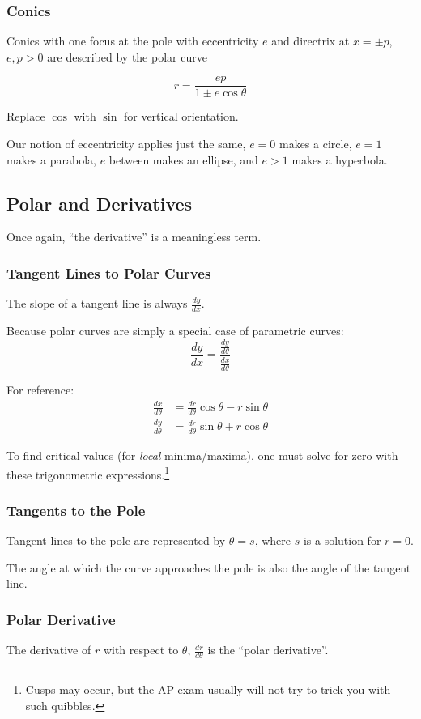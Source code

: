 \documentclass{article}
\begin{document}
\subsubsection{Conics}
Conics with one focus at the pole with eccentricity $e$ and directrix at $x = \pm p$, $e,p > 0$ are described by the polar curve

$$r = \frac{ep}{1\pm e\cos{\theta}}$$

Replace $\cos$ with $\sin$ for vertical orientation.

Our notion of eccentricity applies just the same, $e=0$ makes a circle, $e=1$ makes a parabola, $e$ between makes an ellipse, and $e > 1$ makes a hyperbola.
\subsection{Polar and Derivatives}
Once again, ``the derivative'' is a meaningless term.

\subsubsection{Tangent Lines to Polar Curves} \label{polar-derivatives}
The slope of a tangent line is always $\frac{dy}{dx}$.

Because polar curves are simply a special case of parametric curves:
$$\frac{dy}{dx} = \frac{\frac{dy}{d\theta}}{\frac{dx}{d\theta}}$$

For reference:
\begin{align*}
    \frac{dx}{d\theta} &= \frac{dr}{d\theta}\cos{\theta}-r\sin{\theta}\\
    \frac{dy}{d\theta} &= \frac{dr}{d\theta}\sin{\theta}+r\cos{\theta}
\end{align*}

To find critical values (for \emph{local} minima/maxima), one must solve for zero with these trigonometric expressions.\footnote{Cusps may occur, but the AP exam usually will not try to trick you with such quibbles.}

\subsubsection{Tangents to the Pole}
Tangent lines to the pole are represented by $\theta = s$, where $s$ is a solution for $r = 0$.

The angle at which the curve approaches the pole is also the angle of the tangent line.

\subsubsection{Polar Derivative}
The derivative of $r$ with respect to $\theta$, $\frac{dr}{d\theta}$ is the ``polar derivative''.
\end{document}

